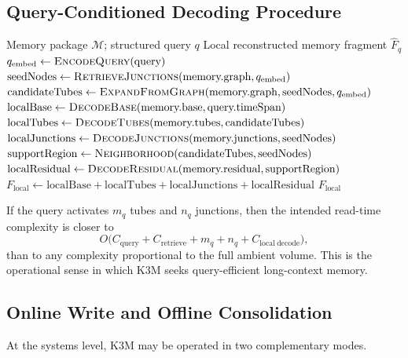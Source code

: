 \documentclass[11pt]{article}
\begin{document}
\subsection{Query-Conditioned Decoding Procedure}
\begin{algorithm}[h]
\caption{Reference query-conditioned K3M decoding procedure}
\label{alg:k3m-query-decode}
\begin{algorithmic}[1]
\Require Memory package $\mathcal{M}$; structured query $q$
\Ensure Local reconstructed memory fragment $\hat F_q$
\State $q_{\mathrm{embed}} \gets \Call{EncodeQuery}{\text{query}}$
\State $\mathrm{seedNodes} \gets \Call{RetrieveJunctions}{\text{memory.graph}, q_{\mathrm{embed}}}$
\State $\mathrm{candidateTubes} \gets \Call{ExpandFromGraph}{\text{memory.graph}, \mathrm{seedNodes}, q_{\mathrm{embed}}}$
\State $\mathrm{localBase} \gets \Call{DecodeBase}{\text{memory.base}, \text{query.timeSpan}}$
\State $\mathrm{localTubes} \gets \Call{DecodeTubes}{\text{memory.tubes}, \mathrm{candidateTubes}}$
\State $\mathrm{localJunctions} \gets \Call{DecodeJunctions}{\text{memory.junctions}, \mathrm{seedNodes}}$
\State $\mathrm{supportRegion} \gets \Call{Neighborhood}{\mathrm{candidateTubes}, \mathrm{seedNodes}}$
\State $\mathrm{localResidual} \gets \Call{DecodeResidual}{\text{memory.residual}, \mathrm{supportRegion}}$
\State $F_{\mathrm{local}} \gets \mathrm{localBase} + \mathrm{localTubes} + \mathrm{localJunctions} + \mathrm{localResidual}$
\State \Return $F_{\mathrm{local}}$
\EndProcedure
\end{algorithmic}
\end{algorithm}
If the query activates $m_q$ tubes and $n_q$ junctions, then the intended read-time complexity is closer to
\begin{equation}
O\bigl(C_{\mathrm{query}} + C_{\mathrm{retrieve}} + m_q + n_q + C_{\mathrm{local\ decode}}\bigr),
\end{equation}
than to any complexity proportional to the full ambient volume. This is the operational sense in which K3M seeks query-efficient long-context memory.

\subsection{Online Write and Offline Consolidation}
At the systems level, K3M may be operated in two complementary modes.
\end{document}
